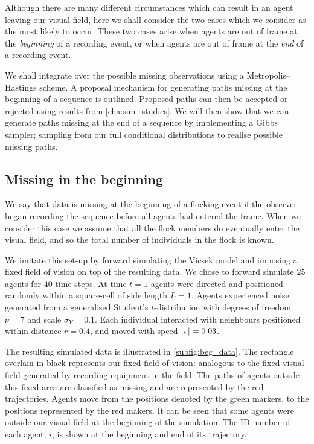 Although there are many different circumstances which can result in an agent
leaving our visual field, here we shall consider the two cases which we
consider as the most likely to occur. These two cases arise when agents are
out of frame at the \emph{beginning} of a recording event, or when
agents are out of frame at the \emph{end} of a recording event.

We shall integrate over the possible missing observations using a
Metropolis--Hastings scheme. A proposal mechanism for generating paths missing
at the beginning of a sequence is outlined. Proposed paths can then be accepted
or rejected using results from \cref{cha:sim_studies}. We will then show that
we can generate paths missing at the end of a sequence by implementing a Gibbs
sampler; sampling from our full conditional distributions to realise possible
missing paths.

\subsection{Missing in the beginning}

We say that data is missing at the beginning of a flocking event if the
observer began recording the sequence before all agents had entered the frame.
When we consider this case we assume that all the flock members do eventually
enter the visual field, and so the total number of individuals in the flock is
known.

We imitate this set-up by forward simulating the Vicsek model and imposing a
fixed field of vision on top of the resulting data. We chose to forward
simulate $25$ agents for $40$ time steps. At time $t=1$ agents were directed
and positioned randomly within a square-cell of side length $L=1$. Agents
experienced noise generated from a generalised Student's $t$-distribution with
degrees of freedom $\nu=7$ and scale $\sigma_Y=0.1$. Each individual interacted
with neighbours positioned within distance $r=0.4$, and moved with speed
$\abs{v}=0.03$.

The resulting simulated data is illustrated in \cref{subfig:beg_data}. The
rectangle overlain in black represents our fixed field of vision: analogous to
the fixed visual field generated by recording equipment in the field. The paths
of agents outside this fixed area are classified as missing and are represented
by the red trajectories. Agents move from the positions denoted by the green
markers, to the positions represented by the red makers. It can be seen that
some agents were outside our visual field at the beginning of the simulation.
The ID number of each agent, $i$, is shown at the beginning and end of its
trajectory.

